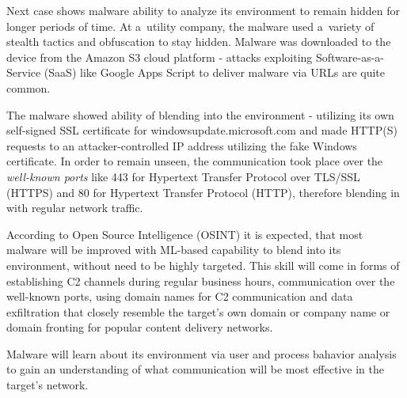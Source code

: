 Next case shows malware ability to analyze its environment to remain hidden for longer periods of time.
At a~utility company, the malware used a~variety of stealth tactics and obfuscation to stay hidden.
Malware was downloaded to the device from the Amazon S3 cloud platform - attacks exploiting Software-as-a-Service (SaaS) like Google Apps Script to deliver malware via URLs are quite common.

The malware showed ability of blending into the environment - utilizing its own self-signed SSL certificate for windowsupdate.microsoft.com and made HTTP(S) requests to an attacker-controlled IP address utilizing the fake Windows certificate.
In order to remain unseen, the communication took place over the \textit{well-known ports} like 443 for Hypertext Transfer Protocol over TLS/SSL (HTTPS) and 80 for Hypertext Transfer Protocol (HTTP), therefore blending in with regular network traffic.

According to Open Source Intelligence (OSINT) it is expected, that most malware will be improved with ML-based capability to blend into its environment, without need to be highly targeted.
This skill will come in forms of establishing C2 channels during regular business hours, communication over the well-known ports, using domain names for C2 communication and data exfiltration that closely resemble the target’s own domain or company name or domain fronting for popular content delivery networks.

Malware will learn about its environment via user and process bahavior analysis to gain an understanding of what communication will be most effective in the target’s network.
